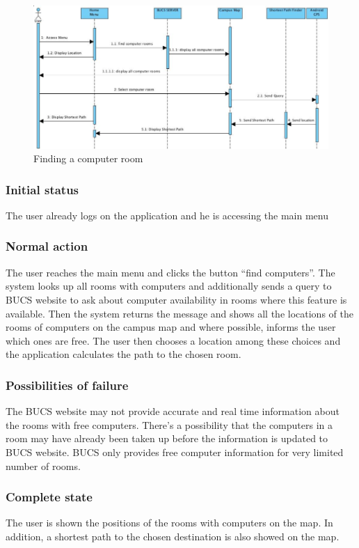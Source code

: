 \documentclass[10pt,a4paper,oneside]{report}
\begin{document}
\begin{figure}[H]
 \centering
 \includegraphics[keepaspectratio, scale=0.5]{seqcomp.png}
 \caption{Finding a computer room}
\end{figure}

\subsubsection*{Initial status}
The user already logs on the application and he is accessing the main menu
\subsubsection*{Normal action}
The user reaches the main menu and clicks the button “find computers”. The system looks up all rooms with computers and additionally sends a query to BUCS website to ask about computer availability in rooms where this feature is available. Then the system returns the message and shows all the locations of the rooms of computers on the campus map and where possible, informs the user which ones are free. The user then chooses a location among these choices and the application calculates the path to the chosen room.
\subsubsection*{Possibilities of failure}
The BUCS website may not provide accurate and real time information about the rooms with free computers. There’s a possibility that the computers in a room may have already been taken up before the information is updated to BUCS website. BUCS only provides free computer information for very limited number of rooms.
\subsubsection*{Complete state}
The user is shown the positions of the rooms with computers on the map. In addition, a shortest path to the chosen destination is also showed on the map.
\end{document}
